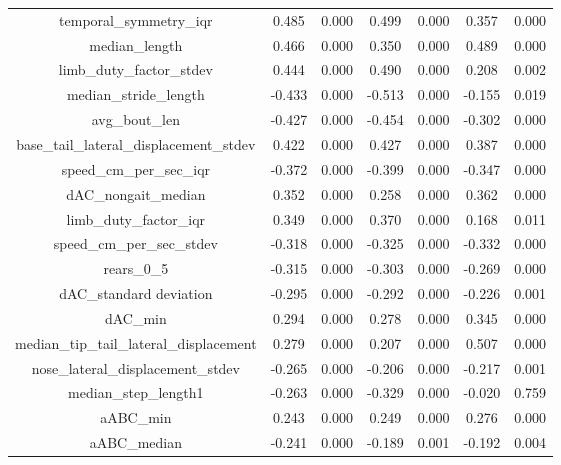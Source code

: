 \documentclass[11pt,reqno]{amsart}
\begin{document}
\begin{longtable}[c]{|c|c|c|c|c|c|c|}
temporal\_symmetry\_iqr                   & 0.485    & 0.000   & 0.499  & 0.000   & 0.357   & 0.000   \\
median\_length                            & 0.466    & 0.000   & 0.350  & 0.000   & 0.489   & 0.000   \\
limb\_duty\_factor\_stdev                 & 0.444    & 0.000   & 0.490  & 0.000   & 0.208   & 0.002   \\
median\_stride\_length                    & -0.433   & 0.000   & -0.513 & 0.000   & -0.155  & 0.019   \\
avg\_bout\_len                            & -0.427   & 0.000   & -0.454 & 0.000   & -0.302  & 0.000   \\
base\_tail\_lateral\_displacement\_stdev  & 0.422    & 0.000   & 0.427  & 0.000   & 0.387   & 0.000   \\
speed\_cm\_per\_sec\_iqr                  & -0.372   & 0.000   & -0.399 & 0.000   & -0.347  & 0.000   \\
dAC\_nongait\_median                      & 0.352    & 0.000   & 0.258  & 0.000   & 0.362   & 0.000   \\
limb\_duty\_factor\_iqr                   & 0.349    & 0.000   & 0.370  & 0.000   & 0.168   & 0.011   \\
speed\_cm\_per\_sec\_stdev                & -0.318   & 0.000   & -0.325 & 0.000   & -0.332  & 0.000   \\
rears\_0\_5                               & -0.315   & 0.000   & -0.303 & 0.000   & -0.269  & 0.000   \\
dAC\_standard deviation                   & -0.295   & 0.000   & -0.292 & 0.000   & -0.226  & 0.001   \\
dAC\_min                                  & 0.294    & 0.000   & 0.278  & 0.000   & 0.345   & 0.000   \\
median\_tip\_tail\_lateral\_displacement  & 0.279    & 0.000   & 0.207  & 0.000   & 0.507   & 0.000   \\
nose\_lateral\_displacement\_stdev        & -0.265   & 0.000   & -0.206 & 0.000   & -0.217  & 0.001   \\
median\_step\_length1                     & -0.263   & 0.000   & -0.329 & 0.000   & -0.020  & 0.759   \\
aABC\_min                                 & 0.243    & 0.000   & 0.249  & 0.000   & 0.276   & 0.000   \\
aABC\_median                              & -0.241   & 0.000   & -0.189 & 0.001   & -0.192  & 0.004   \\

\end{longtable}
\end{document}
